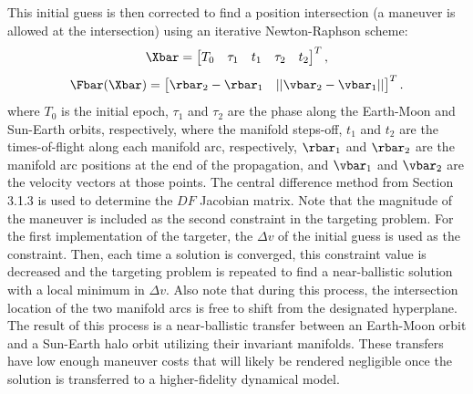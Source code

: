 This initial guess is then corrected to find a position intersection (a maneuver is allowed at the
intersection) using an iterative Newton-Raphson scheme:
\begin{equation}
    \Xbar=\begin{bmatrix}   T_{0}   &   \tau_{1}    &   t_{1}   &   \tau_{2}    &   t_{2}   \end{bmatrix}^{T},
    \label{eq:nbfreevar}
\end{equation}
\begin{equation}
    \Fbar(\Xbar)=\begin{bmatrix}    \rbar_{2}-\rbar_{1} &   ||\vbar_{2}-\vbar_{1}|| \end{bmatrix}^{T}.
    \label{eq:nbconst}
\end{equation}
where $T_{0}$ is the initial epoch, $\tau_{1}$ and $\tau_{2}$ are the phase along the Earth-Moon
and Sun-Earth orbits, respectively, where the manifold steps-off, $t_{1}$ and $t_{2}$ are the
times-of-flight along each manifold arc, respectively, $\rbar_{1}$ and $\rbar_{2}$ are the manifold
arc positions at the end of the propagation, and $\vbar_{1}$ and $\vbar_{2}$ are the velocity
vectors at those points. The central difference method from Section 3.1.3 is used to determine the
$DF$ Jacobian matrix. Note that the magnitude of the maneuver is included as the second constraint
in the targeting problem. For the first implementation of the targeter, the $\Delta v$ of the
initial guess is used as the constraint. Then, each time a solution is converged, this constraint
value is decreased and the targeting problem is repeated to find a near-ballistic solution with a
local minimum in $\Delta v$. Also note that during this process, the intersection location of the
two manifold arcs is free to shift from the designated hyperplane. The result of this process is a
near-ballistic transfer between an Earth-Moon orbit and a Sun-Earth halo orbit utilizing their
invariant manifolds. These transfers have low enough maneuver costs that will likely be rendered
negligible once the solution is transferred to a higher-fidelity dynamical model.

